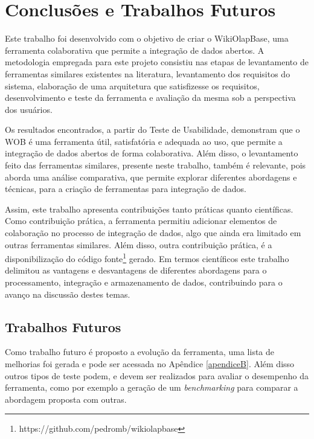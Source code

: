 
\chapter{Conclusões e Trabalhos Futuros}
\label{chap:conclusao}

Este trabalho foi desenvolvido com o objetivo de criar o WikiOlapBase, uma ferramenta
colaborativa que permite a integração de dados abertos. A metodologia empregada para este 
projeto consistiu nas etapas de levantamento de ferramentas similares existentes na literatura, 
levantamento dos requisitos do sistema, elaboração de uma arquitetura que satisfizesse os
requisitos, desenvolvimento e teste da ferramenta e avaliação da mesma sob a perspectiva dos
usuários. 

Os resultados encontrados, a partir do Teste de Usabilidade, demonstram que o WOB é uma 
ferramenta útil, satisfatória e adequada ao uso, que permite a integração de dados abertos de 
forma colaborativa. Além disso, o levantamento feito das ferramentas similares, presente neste 
trabalho, também é relevante, pois aborda uma análise comparativa, que permite explorar 
diferentes abordagens e técnicas, para a criação de ferramentas para integração de dados.

Assim, este trabalho apresenta contribuições tanto práticas quanto científicas. Como contribuição
prática, a ferramenta permitiu adicionar elementos de colaboração no processo de integração de 
dados, algo que ainda era limitado em outras ferramentas similares. Além disso, outra contribuição
prática, é a disponibilização do código fonte\footnote{https://github.com/pedromb/wikiolapbase} gerado.
Em termos científicos este trabalho delimitou as vantagens e desvantagens de diferentes 
abordagens para o processamento, integração e armazenamento de dados, contribuindo para o 
avanço na discussão destes temas.

\section{Trabalhos Futuros}
\label{sec:trablhos}

Como trabalho futuro é proposto a evolução da ferramenta, uma lista de melhorias foi gerada
e pode ser acessada no Apêndice \ref{apendiceB}. Além disso outros tipos de teste podem, e 
devem ser realizados para avaliar o desempenho da ferramenta, como por exemplo a geração de 
um \textit{benchmarking} para comparar a abordagem proposta com outras.

